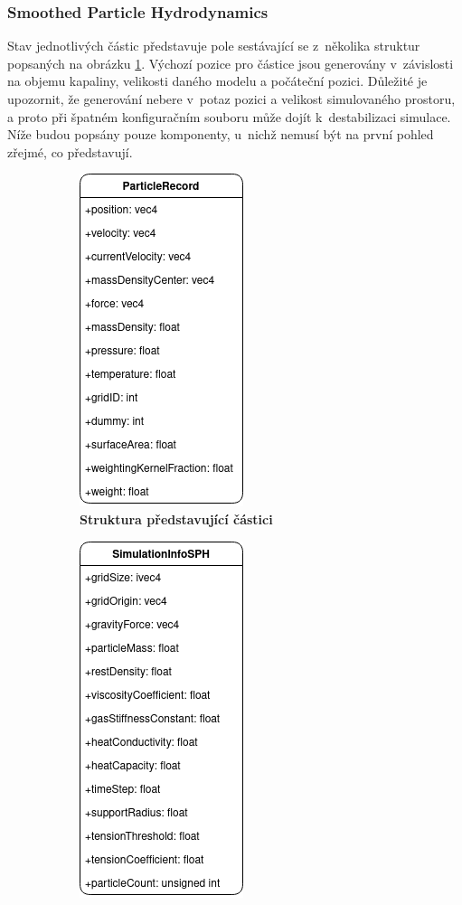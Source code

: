 \subsubsection{Smoothed Particle Hydrodynamics}
Stav jednotlivých částic představuje pole sestávající se z~několika struktur popsaných na obrázku \ref{fig:ParticleRecord}. Výchozí pozice pro částice jsou generovány v~závislosti na objemu kapaliny, velikosti daného modelu a počáteční pozici. Důležité je upozornit, že generování nebere v~potaz pozici a velikost simulovaného prostoru, a proto při špatném konfiguračním souboru může dojít k~destabilizaci simulace. Níže budou popsány pouze komponenty, u~nichž nemusí být na první pohled zřejmé, co představují. 

\begin{figure}[h]
	\centering
	\captionsetup{justification=centering}
	\begin{subfigure}[t]{.5\textwidth}
			\centering
        	\includegraphics[scale=0.6]{obrazky-figures/ParticleRecord.png}
        	\caption{\textbf{Struktura představující částici}}
        	\label{fig:ParticleRecord}
	\end{subfigure}%
	\begin{subfigure}[t]{.5\textwidth}
		\centering
		\includegraphics[scale=0.6]{obrazky-figures/SimulationInfoSPH.png}

\end{subfigure}
\end{figure}
